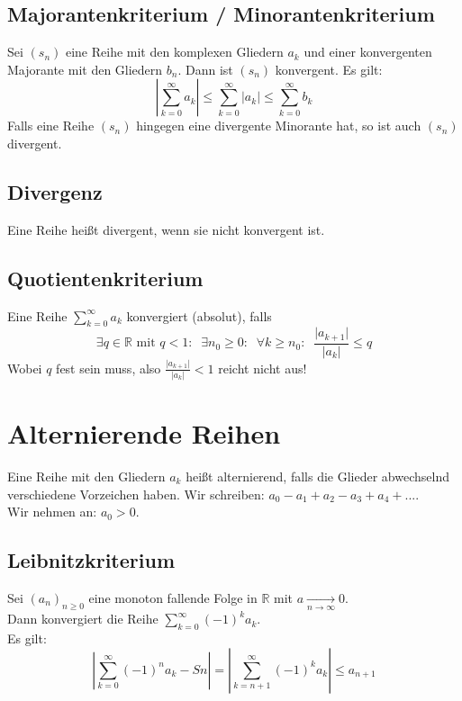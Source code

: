 \documentclass[halfparscip]{scrartcl}
\newcounter{subsection2}
\begin{document}
\subsection{Majorantenkriterium / Minorantenkriterium}
Sei $(s_n)$ eine Reihe mit den komplexen Gliedern $a_k$ und einer konvergenten Majorante mit den Gliedern $b_n$. Dann ist $(s_n)$ konvergent.
Es gilt:
\begin{equation*}
	\left\vert\sum_{k=0}^{\infty}a_k\right\vert \leq \sum_{k=0}^\infty \vert a_k\vert \leq \sum_{k=0}^\infty b_k
\end{equation*}
Falls eine Reihe $(s_n)$ hingegen eine divergente Minorante hat, so ist auch $(s_n)$ divergent.


\subsection{Divergenz}
Eine Reihe heißt divergent, wenn sie nicht konvergent ist.

\subsection{Quotientenkriterium}
Eine Reihe $\sum_{k=0}^\infty a_k$ konvergiert (absolut), falls
\begin{equation*}
	\exists q \in \mathbb{R} \text{ mit } q < 1: \;\; \exists n_0 \geq 0: \;\; \forall k \geq n_0: \;\; \frac{\vert a_{k+1}\vert}{\vert a_k\vert} \leq q
\end{equation*}
Wobei $q$ fest sein muss, also $\frac{\vert a_{k+1}\vert}{\vert a_k\vert} < 1$ reicht nicht aus!

\setcounter{subsection2}{\value{subsection}}
\section*{Alternierende Reihen}
\setcounter{subsection}{\value{subsection2}}
Eine Reihe mit den Gliedern $a_k$ heißt alternierend, falls die Glieder abwechselnd verschiedene Vorzeichen haben. Wir schreiben: $a_0 - a_1 + a_2 - a_3 + a_4 + ...$.\\
Wir nehmen an: $a_0 > 0$.

\subsection{Leibnitzkriterium}
Sei $(a_n)_{n\geq0}$ eine monoton fallende Folge in $\mathbb{R}$ mit $a \xrightarrow[n \rightarrow \infty]{} 0$.\\
Dann konvergiert die Reihe $\sum\limits_{k=0}^\infty(-1)^ka_k$.\\
Es gilt:
\begin{equation*}
	\left\vert \sum_{k=0}^{\infty}(-1)^na_k-Sn\right\vert = \left\vert \sum_{k=n+1}^{\infty}(-1)^ka_k\right\vert \leq a_{n+1}
\end{equation*}
\end{document}

